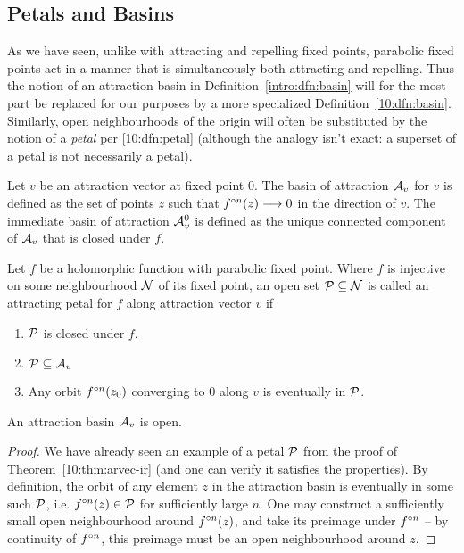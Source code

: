 \documentclass[../main.tex]{subfiles}
\begin{document}
\subsection{Petals and Basins}
As we have seen, unlike with attracting and repelling fixed points, parabolic fixed points act in a manner that is simultaneously both attracting and repelling. Thus the notion of an attraction basin in Definition~\ref{intro:dfn:basin} will for the most part be replaced for our purposes by a more specialized Definition~\ref{10:dfn:basin}. Similarly, open neighbourhoods of the origin will often be substituted by the notion of a \emph{petal} per \ref{10:dfn:petal} (although the analogy isn't exact: a superset of a petal is not necessarily a petal).
 
\begin{dfn}
    \label{10:dfn:basin}
    Let $v$ be an attraction vector at fixed point 0. The basin of attraction $\mathcal{A}_v$ for $v$ is defined as the set of points $z$ such that $f^{\circ n}(z)\longrightarrow 0$ in the direction of $v$. The immediate basin of attraction $\mathcal{A}_v^0$ is defined as the unique connected component of $\mathcal{A}_v$ that is closed under $f$.
\end{dfn}
\begin{dfn}
    \label{10:dfn:petal}
    Let $f$ be a holomorphic function with parabolic fixed point. Where $f$ is injective on some neighbourhood $\mathcal{N}$ of its fixed point, an open set $\mathcal{P} \subseteq \mathcal{N}$ is called an attracting petal for $f$ along attraction vector $v$ if 
    \begin{enumerate} 
        \item $\mathcal{P}$ is closed under $f$.
        \item $\mathcal{P}\subseteq\mathcal{A}_v$
        \item Any orbit $f^{\circ n}(z_0)$ converging to 0 along $v$ is eventually in $\mathcal{P}$. 
    \end{enumerate}
\end{dfn}
\begin{lem}
    \label{10:lem:basinopen}
    An attraction basin $\mathcal{A}_v$ is open.
\end{lem}
\begin{proof}
    We have already seen an example of a petal $\mathcal{P}$ from the proof of Theorem~\ref{10:thm:arvec-ir} (and one can verify it satisfies the properties). By definition, the orbit of any element $z$ in the attraction basin is eventually in some such $\mathcal{P}$, i.e. $f^{\circ n}(z)\in\mathcal{P}$ for sufficiently large $n$. One may construct a sufficiently small open neighbourhood around $f^{\circ n}(z)$, and take its preimage under $f^{\circ n}$ -- by continuity of $f^{\circ n}$, this preimage must be an open neighbourhood around $z$.  
\end{proof}
\end{document}
